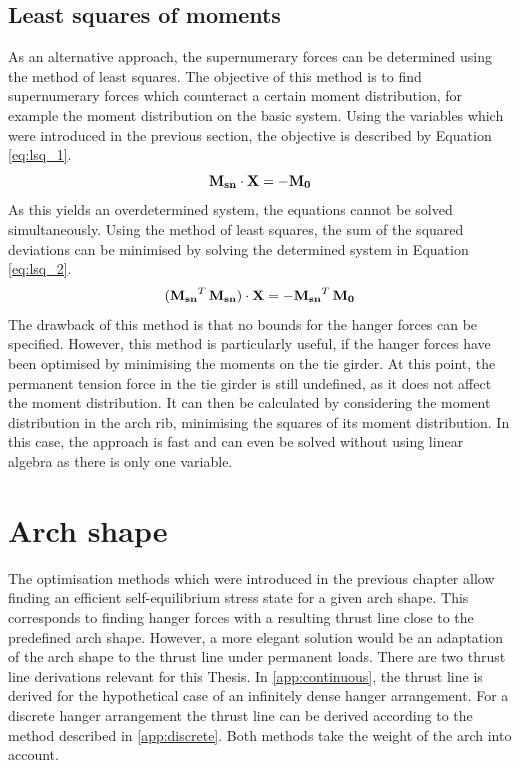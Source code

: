 \subsection{Least squares of moments}
As an alternative approach, the supernumerary forces can be determined using the method of least squares. The objective of this method is to find supernumerary forces which counteract a certain moment distribution, for example the moment distribution on the basic system. Using the variables which were introduced in the previous section, the objective is described by Equation \eqref{eq:lsq_1}.
\begin{equation}
    {\bf M_{sn}} \cdot {\bf X} = -{\bf M_0}
    \label{eq:lsq_1}
\end{equation}
As this yields an overdetermined system, the equations cannot be solved simultaneously. Using the method of least squares, the sum of the squared deviations can be minimised by solving the determined system in Equation \eqref{eq:lsq_2}.
\begin{equation}
    ({\bf M_{sn}}^T\,{\bf M_{sn}}) \cdot {\bf X} = -{\bf M_{sn}}^T\,{\bf M_0}
    \label{eq:lsq_2}
\end{equation}
The drawback of this method is that no bounds for the hanger forces can be specified. However, this method is particularly useful, if the hanger forces have been optimised by minimising the moments on the tie girder. At this point, the permanent tension force in the tie girder is still undefined, as it does not affect the moment distribution. It can then be calculated by considering the moment distribution in the arch rib, minimising the squares of its moment distribution. In this case, the approach is fast and can even be solved without using linear algebra as there is only one variable.


\newpage
\section{Arch shape} \label{sec:met_arch}
The optimisation methods which were introduced in the previous chapter allow finding an efficient self-equilibrium stress state for a given arch shape. This corresponds to finding hanger forces with a resulting thrust line close to the predefined arch shape. However, a more elegant solution would be an adaptation of the arch shape to the thrust line under permanent loads. There are two thrust line derivations relevant for this Thesis. In \cref{app:continuous}, the thrust line is derived for the hypothetical case of an infinitely dense hanger arrangement. For a discrete hanger arrangement the thrust line can be derived according to the method described in \cref{app:discrete}. Both methods take the weight of the arch into account.

